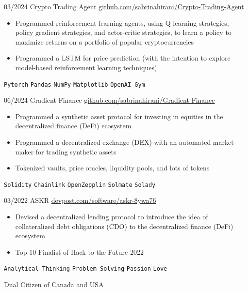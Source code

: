 \documentclass[9pt]{developercv} %
\begin{document}
\begin{entrylist}
    \entry
		{03/2024}
		{Crypto Trading Agent}
		{\href{https://github.com/sabrinahirani/Crypto-Trading-Agent}{github.com/sabrinahirani/Crypto-Trading-Agent}}
		{
        \vspace{-10pt}
        \begin{itemize}[itemsep=3pt,topsep=0pt,parsep=0pt,partopsep=0pt, leftmargin=-1pt]
            \item Programmed reinforcement learning agents, using Q learning strategies, policy gradient strategies, and actor-critic strategies, to learn a policy to maximize returns on a portfolio of popular cryptocurrencies
            \item Programmed a LSTM for price prediction (with the intention to explore model-based reinforcement learning techniques)
        \end{itemize} 
        \vspace{5pt}
        \texttt{Pytorch} \slashsep \texttt{Pandas} \slashsep \texttt{NumPy} \slashsep \texttt{Matplotlib} \slashsep \texttt{OpenAI Gym}
        }
    \entry
		{06/2024}
		{Gradient Finance}
		{\href{https://github.com/sabrinahirani/Gradient-Finance}{github.com/sabrinahirani/Gradient-Finance}}
		{
        \vspace{-10pt}
        \begin{itemize}[itemsep=3pt,topsep=0pt,parsep=0pt,partopsep=0pt, leftmargin=-1pt]
            \item Programmed a synthetic asset protocol for investing in equities in the decentralized finance (DeFi) ecosystem
            \item Programmed a decentralized exchange (DEX) with an automated market maker for trading synthetic assets
            \item Tokenized vaults, price oracles, liquidity pools, and lots of tokens
        \end{itemize} 
        \vspace{5pt}
        \texttt{Solidity} \slashsep \texttt{Chainlink} \slashsep \texttt{OpenZepplin} \slashsep \texttt{Solmate} \slashsep \texttt{Solady}
        }
    \entry
		{03/2022}
		{ASKR}
		{\href{https://devpost.com/software/askr-8ywa76}{devpost.com/software/askr-8ywa76}}
		{
        \vspace{-10pt}
        \begin{itemize}[itemsep=3pt,topsep=0pt,parsep=0pt,partopsep=0pt, leftmargin=-1pt]
            \item Devised a decentralized lending protocol to introduce the idea of collateralized debt obligations (CDO) to the decentralized finance (DeFi) ecosystem
            \item Top 10 Finalist of Hack to the Future 2022
        \end{itemize} 
        \vspace{5pt}
        \texttt{Analytical Thinking} \slashsep \texttt{Problem Solving} \slashsep \texttt{Passion} \slashsep \texttt{Love}
        }
\end{entrylist}

\begin{center}
Dual Citizen of Canada and USA
\end{center}

\end{document}
